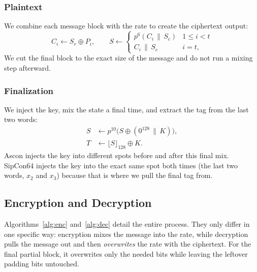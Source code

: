 \subsubsection{Plaintext}
We combine each message block with the rate to create the ciphertext output:
\begin{equation}
C_i \leftarrow S_r \oplus P_i, \qquad
S \leftarrow
\begin{cases}
p^{6}(C_i \,\|\, S_c) & 1 \le i < t\\
C_i \,\|\, S_c & i = t,
\end{cases}
\label{eq:pt}
\end{equation}
We cut the final block to the exact size of the message and do not run a mixing step afterward.

\subsubsection{Finalization}
We inject the key, mix the state a final time, and extract the tag from the last two words:
\begin{align}
S &\leftarrow p^{10}\big(S \oplus (0^{128} \,\|\, K)\big),
\nonumber\\
T &\leftarrow \lfloor S \rfloor_{128} \oplus K.
\label{eq:final}
\end{align}
Ascon injects the key into different spots before and after this final mix. SipCon64 injects the key into the exact same spot both times (the last two words, $x_2$ and $x_3$) because that is where we pull the final tag from.

\subsection{Encryption and Decryption}

Algorithms~\ref{alg:enc} and~\ref{alg:dec} detail the entire process. They only differ in one specific way: encryption mixes the message into the rate, while decryption pulls the message out and then \emph{overwrites} the rate with the ciphertext. For the final partial block, it overwrites only the needed bits while leaving the leftover padding bits untouched.

